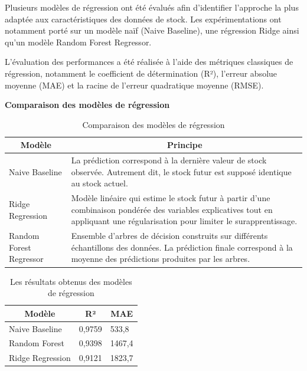 Plusieurs modèles de régression ont été évalués afin d'identifier l'approche la plus adaptée aux caractéristiques des données de stock. Les expérimentations ont notamment porté sur un modèle naïf (Naive Baseline), une régression Ridge ainsi qu'un modèle Random Forest Regressor.
 
L'évaluation des performances a été réalisée à l'aide des métriques classiques de régression, notamment le coefficient de détermination (R²), l'erreur absolue moyenne (MAE) et la racine de l'erreur quadratique moyenne (RMSE).
 
\textbf{Comparaison des modèles de régression}
 \renewcommand{\arraystretch}{1.2}
\begin{table}[H]

\centering
\caption{Comparaison des modèles de régression}
\label{tab:ch4:comparaison_regression}
\small
\begin{tabular}{|p{4.5cm}|p{12cm}|}
\hline
\multicolumn{1}{|c|}{\textbf{Modèle}} & \multicolumn{1}{c|}{\textbf{Principe}} \\
\hline
Naive Baseline & La prédiction correspond à la dernière valeur de stock observée. Autrement dit, le stock futur est supposé identique au stock actuel. \\
\hline
Ridge Regression & Modèle linéaire qui estime le stock futur à partir d'une combinaison pondérée des variables explicatives tout en appliquant une régularisation pour limiter le surapprentissage. \\
\hline
Random Forest Regressor & Ensemble d'arbres de décision construits sur différents échantillons des données. La prédiction finale correspond à la moyenne des prédictions produites par les arbres. \\
\hline
\end{tabular}
\end{table}
 \renewcommand{\arraystretch}{1.2}
\begin{table}[H]
\centering
\caption{Les résultats obtenus des modèles de régression}
\label{tab:ch4:resultats_regression}
\small
\begin{tabular}{|p{4cm}|p{3cm}|p{3cm}|}
\hline
\multicolumn{1}{|c|}{\textbf{Modèle}} & 
\multicolumn{1}{c|}{\textbf{R²}} & 
\multicolumn{1}{c|}{\textbf{MAE}} \\
\hline
Naive Baseline & 0,9759 & 533,8 \\
\hline
Random Forest & 0,9398 & 1467,4 \\
\hline
Ridge Regression & 0,9121 & 1823,7 \\
\hline
\end{tabular}
\end{table}
 
